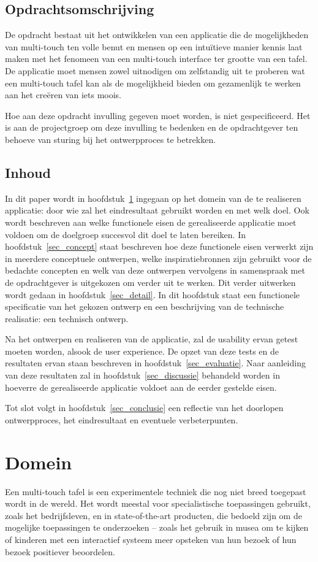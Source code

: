\documentclass{acm}
\begin{document}
\subsection{Opdrachtsomschrijving}
De opdracht bestaat uit het ontwikkelen van een applicatie die de mogelijkheden van multi-touch ten volle benut en mensen op een intu\"itieve manier kennis laat maken met het fenomeen van een multi-touch interface ter grootte van een tafel. De applicatie moet mensen zowel uitnodigen om zelfstandig uit te proberen wat een multi-touch tafel kan als de mogelijkheid bieden om gezamenlijk te werken aan het cre\"eren van iets moois.

Hoe aan deze opdracht invulling gegeven moet worden, is niet gespecificeerd. Het is aan de projectgroep om deze invulling te bedenken en de opdrachtgever ten behoeve van sturing bij het ontwerpproces te betrekken.

\subsection{Inhoud}
In dit paper wordt in hoofdstuk~\ref{sec_domein} ingegaan op het domein van de te realiseren applicatie: door wie zal het eindresultaat gebruikt worden en met welk doel. Ook wordt beschreven aan welke functionele eisen de gerealiseerde applicatie moet voldoen om de doelgroep succesvol dit doel te laten bereiken. In hoofdstuk~\ref{sec_concept} staat beschreven hoe deze functionele eisen verwerkt zijn in meerdere conceptuele ontwerpen, welke inspiratiebronnen zijn gebruikt voor de bedachte concepten en welk van deze ontwerpen vervolgens in samenspraak met de opdrachtgever is uitgekozen om verder uit te werken. Dit verder uitwerken wordt gedaan in hoofdstuk~\ref{sec_detail}. In dit hoofdstuk staat een functionele specificatie van het gekozen ontwerp en een beschrijving van de technische realisatie: een technisch ontwerp.

Na het ontwerpen en realiseren van de applicatie, zal de usability ervan getest moeten worden, alsook de user experience. De opzet van deze tests en de resultaten ervan staan beschreven in hoofdstuk~\ref{sec_evaluatie}. Naar aanleiding van deze resultaten zal in hoofdstuk~\ref{sec_discussie} behandeld worden in hoeverre de gerealiseerde applicatie voldoet aan de eerder gestelde eisen.

Tot slot volgt in hoofdstuk~\ref{sec_conclusie} een reflectie van het doorlopen ontwerpproces, het eindresultaat en eventuele verbeterpunten.

\section{Domein}
\label{sec_domein}
Een multi-touch tafel is een experimentele techniek die nog niet breed toegepast wordt in de wereld. Het wordt meestal voor specialistische toepassingen gebruikt, zoals het bedrijfsleven, en in state-of-the-art producten, die bedoeld zijn om de mogelijke toepassingen te onderzoeken -- zoals het gebruik in musea om te kijken of kinderen met een interactief systeem meer opsteken van hun bezoek of hun bezoek positiever beoordelen.
\end{document}
